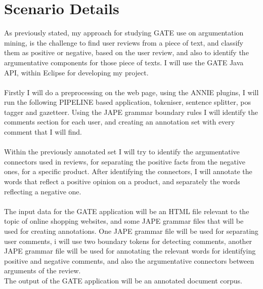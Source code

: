 \documentclass[a4paper,12pt]{report}
\begin{document}
\section{Scenario Details}
           As previously stated, my approach for studying GATE use on argumentation mining, is the challenge to find user reviews
 from a piece of text, and classify them as positive or negative, based on the user review, and 
also to identify the argumentative components for those piece of texts. I will use the GATE Java API, within Eclipse for developing my project.  
           \\\\
           Firstly I will do a preprocessing on the web page, using the ANNIE plugins, I will run the following PIPELINE based application, tokeniser, sentence splitter, pos tagger and gazetteer. Using the JAPE grammar boundary rules I will identify the comments section for each user, and creating an annotation 
set with every comment that I will find. 
	  \\\\
           Within the previously annotated set I will try to identify the argumentative connectors used in reviews, for separating the positive facts from the negative ones, for a specific product. After identifying the connectors, 
I will annotate the words that reflect a positive opinion on a product, and separately the words reflecting a negative one.  
	  \\\\
	  The input data for the GATE application will be an HTML file relevant to the topic of online shopping websites, and some JAPE grammar files that will be used for creating annotations. One JAPE grammar file will be used for separating user comments, i will use two boundary tokens for detecting comments, another JAPE grammar file will be used for annotating the relevant words for identifying positive and negative comments, and also the argumentative connectors between arguments of the review. 
	  \\
	  The output of the GATE application will be an annotated document corpus.
	  \\
\end{document}
